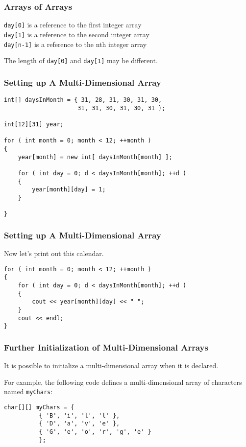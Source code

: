 \begin{frame}
\frametitle{Arrays of Arrays}

\texttt{day[0]} is a reference to the first integer array\\
\texttt{day[1]} is a reference to the second integer array\\
\texttt{day[n-1]} is a reference to the nth integer array


The length of \texttt{day[0]} and \texttt{day[1]} may be different.

\end{frame}

\begin{frame}[fragile]
\frametitle{Setting up A Multi-Dimensional Array}

\begin{verbatim}
int[] daysInMonth = { 31, 28, 31, 30, 31, 30, 
                     31, 31, 30, 31, 30, 31 };

int[12][31] year;

for ( int month = 0; month < 12; ++month )
{
    year[month] = new int[ daysInMonth[month] ];
	
    for ( int day = 0; d < daysInMonth[month]; ++d )
    {
        year[month][day] = 1;
    }

}
\end{verbatim}

\end{frame}

\begin{frame}[fragile]
\frametitle{Setting up A Multi-Dimensional Array}

Now let's print out this calendar.

\begin{verbatim}
for ( int month = 0; month < 12; ++month )
{
    for ( int day = 0; d < daysInMonth[month]; ++d )
    {
        cout << year[month][day] << " ";
    }
    cout << endl;
}
\end{verbatim}

\end{frame}

\begin{frame}[fragile]
\frametitle{Further Initialization of Multi-Dimensional Arrays}
It is possible to initialize a multi-dimensional array when it is declared.

For example, the following code defines a multi-dimensional array of characters named \texttt{myChars}:

\begin{verbatim}
char[][] myChars = {
          { 'B', 'i', 'l', 'l' },
          { 'D', 'a', 'v', 'e' },
          { 'G', 'e', 'o', 'r', 'g', 'e' }
          };
\end{verbatim}

\end{frame}

